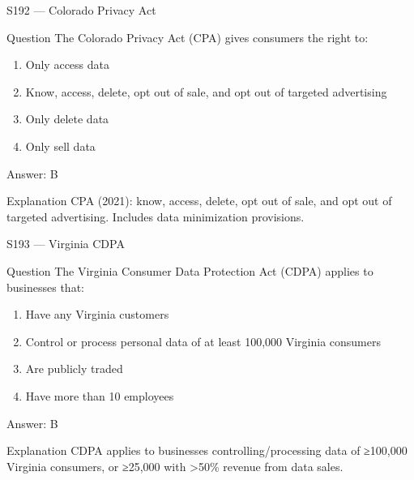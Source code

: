 \documentclass[aspectratio=169,8pt]{beamer}
\begin{document}
\begin{frame}{S192 --- Colorado Privacy Act}
	\begin{block}{Question}
		The Colorado Privacy Act (CPA) gives consumers the right to:
		\begin{enumerate}
			\item Only access data
			\item Know, access, delete, opt out of sale, and opt out of targeted advertising
			\item Only delete data
			\item Only sell data
		\end{enumerate}
	\end{block}
	\begin{exampleblock}{Answer: B}\end{exampleblock}
	\begin{block}{Explanation}
		CPA (2021): know, access, delete, opt out of sale, and opt out of targeted advertising. Includes data minimization provisions.
	\end{block}
\end{frame}

\begin{frame}{S193 --- Virginia CDPA}
	\begin{block}{Question}
		The Virginia Consumer Data Protection Act (CDPA) applies to businesses that:
		\begin{enumerate}
			\item Have any Virginia customers
			\item Control or process personal data of at least 100,000 Virginia consumers
			\item Are publicly traded
			\item Have more than 10 employees
		\end{enumerate}
	\end{block}
	\begin{exampleblock}{Answer: B}\end{exampleblock}
	\begin{block}{Explanation}
		CDPA applies to businesses controlling/processing data of ≥100,000 Virginia consumers, or ≥25,000 with >50\% revenue from data sales.
	\end{block}
\end{frame}
\end{document}
